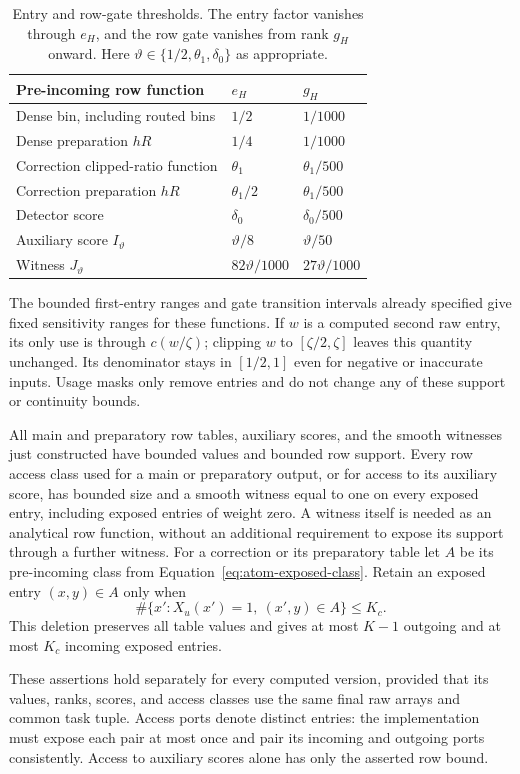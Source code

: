 \begin{table}[htbp]
\centering
\begin{tabular}{@{}lll@{}}
\toprule
Pre-incoming row function & $e_H$ & $g_H$ \\
\midrule
Dense bin, including routed bins & $1/2$ & $1/1000$ \\
Dense preparation $hR$ & $1/4$ & $1/1000$ \\
Correction clipped-ratio function & $\theta_1$ & $\theta_1/500$ \\
Correction preparation $hR$ & $\theta_1/2$ & $\theta_1/500$ \\
Detector score & $\delta_0$ & $\delta_0/500$ \\
Auxiliary score $I_{\vartheta}$ & $\vartheta/8$ & $\vartheta/50$ \\
Witness $J_{\vartheta}$ & $82\vartheta/1000$ & $27\vartheta/1000$ \\
\bottomrule
\end{tabular}
\caption{Entry and row-gate thresholds. The entry factor vanishes through
$e_H$, and the row gate vanishes from rank $g_H$ onward. Here
$\vartheta\in\{1/2,\theta_1,\delta_0\}$ as appropriate.}
\label{tab:atom-compression-thresholds}
\end{table}

The bounded first-entry ranges and gate transition intervals already
specified give fixed sensitivity ranges for these functions.  If $w$
is a computed second raw entry, its only use is through $c(w/\zeta)$;
clipping $w$ to $[\zeta/2,\zeta]$ leaves this quantity unchanged.
Its denominator stays in $[1/2,1]$ even for negative or inaccurate
inputs.  Usage masks only remove entries and do not change any of these
support or continuity bounds.

\begin{lemma}
\label{lem:atom-ports}
All main and preparatory row tables, auxiliary scores, and the smooth
witnesses just constructed have bounded values and bounded row support.
Every row access class used for a main or preparatory output, or for
access to its auxiliary score, has bounded size and a smooth witness
equal to one on every exposed entry, including exposed entries of weight
zero.  A witness itself is needed as an analytical row function, without
an additional requirement to expose its support through a further
witness.  For a correction or its preparatory table let $A$ be its
pre-incoming class from Equation~\eqref{eq:atom-exposed-class}.  Retain an
exposed entry $(x,y)\in A$ only when
\begin{equation}
 \#\{x':X_u(x')=1,\ (x',y)\in A\}\le K_c.
 \label{eq:atom-port-cap}
\end{equation}
This deletion preserves all table values and gives at most $K-1$
outgoing and at most $K_c$ incoming exposed entries.

These assertions hold separately for every computed version, provided
that its values, ranks, scores, and access classes use the same final
raw arrays and common task tuple.  Access ports denote distinct entries:
the implementation must expose each pair at most once and pair its
incoming and outgoing ports consistently.  Access to auxiliary scores
alone has only the asserted row bound.
\end{lemma}

